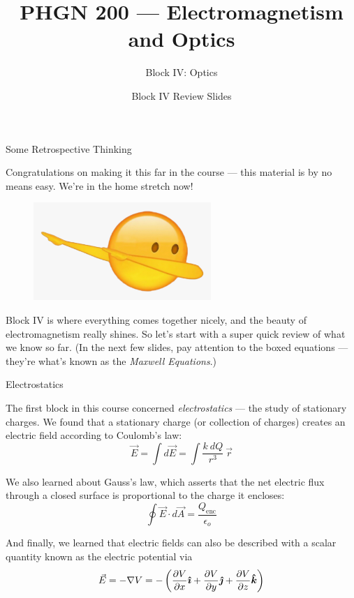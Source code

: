 \documentclass{beamer}
\title{PHGN 200 --- Electromagnetism and Optics}
\subtitle{Block IV: Optics}
\author{}
\date{Block IV Review Slides}
\begin{document}
\frame{\titlepage}

\begin{frame}{Some Retrospective Thinking}

Congratulations on making it this far in the course --- this material is by no means easy. We're in the home stretch now!

\begin{figure}[H]
\centering
\includegraphics[width=0.6\textwidth]{figures/dabbing.png}
\end{figure}

Block IV is where everything comes together nicely, and the beauty of electromagnetism really shines. So let's start with a super quick review of what we know so far. (In the next few slides, pay attention to the boxed equations --- they're what's known as the \emph{Maxwell Equations}.)

\end{frame}

\begin{frame}{Electrostatics}

The first block in this course concerned \emph{electrostatics} --- the study of stationary charges. We found that a stationary charge (or collection of charges) creates an electric field according to Coulomb's law:
\begin{equation*}
    \vec{E} = \int d\vec{E} = \int \frac{k\ dQ}{r^3}\ \vec{r}
\end{equation*}

We also learned about Gauss's law, which asserts that the net electric flux through a closed surface is proportional to the charge it encloses:
\begin{equation*}
    \boxed{\oint \vec{E} \cdot d\vec{A} = \frac{Q_{\text{enc}}}{\epsilon_o}}
\end{equation*}

And finally, we learned that electric fields can also be described with a scalar quantity known as the electric potential via
\begin{equation*}
    \vec{E} = -\nabla V = -\left( \frac{\partial V}{\partial x} \bm{\hat{\imath}} + \frac{\partial V}{\partial y} \bm{\hat{\jmath}} + \frac{\partial V}{\partial z} \bm{\hat{k}} \right)
\end{equation*}

\end{frame}
\end{document}
